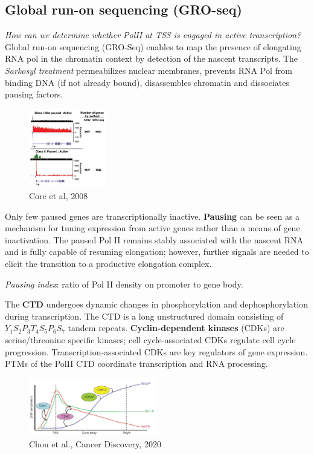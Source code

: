 \hypertarget{global-run-on-sequencing-gro-seq}{%
\subsection{Global run-on sequencing (GRO-seq)}\label{global-run-on-sequencing-gro-seq}}
\emph{How can we determine whether PolII at TSS is engaged in active transcription?}
Global run-on sequencing (GRO-Seq) enables to map the presence of elongating RNA pol in the chromatin context by detection of the nascent transcripts. The \emph{Sarkosyl treatment} permeabilizes nuclear membranes, prevents RNA Pol from binding DNA (if not already bound), disassembles chromatin and dissociates pausing factors.

\begin{figure}
\centering
\includegraphics[width=0.3\textwidth]{../_resources/Screenshot_2022-09-22_at_21-58-03.png}
\caption{Core et al, 2008}
\end{figure}

Only few paused genes are transcriptionally inactive.
\textbf{Pausing} can be seen as a mechanism for tuning expression from active genes rather than a means of gene inactivation. The paused Pol II remains stably associated with the nascent RNA and is fully capable of resuming elongation; however, further signals are needed to elicit the transition to a productive elongation complex.

\emph{Pausing index}: ratio of Pol II density on promoter to gene body.

The \textbf{CTD} undergoes dynamic changes in phosphorylation and dephosphorylation during transcription. The CTD is a long unstructured domain consisting of \(Y_1S_2P_3T_4S_5P_6S_7\) tandem repeats. \textbf{Cyclin-dependent kinases} (CDKs) are serine/threonine specific kinases; cell cycle-associated CDKs regulate cell cycle progression. Transcription-associated CDKs are key regulators of gene expression. PTMs of the PolII CTD coordinate transcription and RNA processing.

\begin{figure}
\centering
\includegraphics[width=0.5\textwidth]{../_resources/Screenshot_2022-09-22_at_22-09-19.png}
\caption{Chou et al., Cancer Discovery, 2020}
\label{fig:phCTD}
\end{figure}

